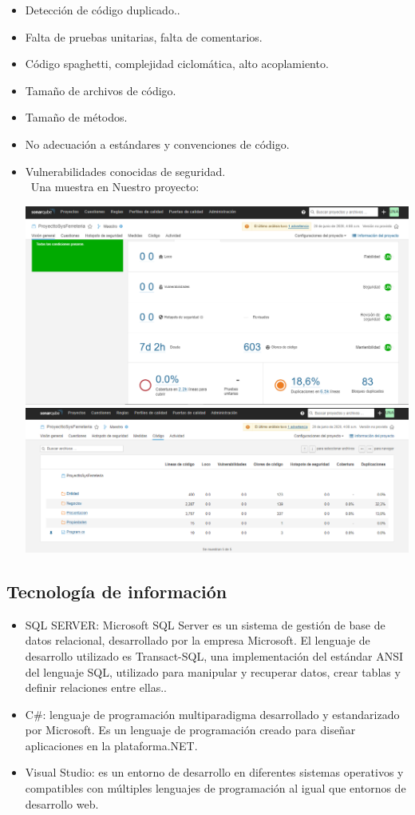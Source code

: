 \documentclass[preprint,12pt]{elsarticle}
\begin{document}
\begin{itemize}
	\item Detección de código duplicado..
	\item Falta de pruebas unitarias, falta de comentarios. 
	\item Código spaghetti, complejidad ciclomática, alto acoplamiento.
	\item Tamaño de archivos de código.
	\item Tamaño de métodos.
	\item No adecuación a estándares y convenciones de código.
	\item Vulnerabilidades conocidas de seguridad.
	\\\
	Una muestra en Nuestro proyecto:
		\begin{center}
	\includegraphics[width=14cm]{./imagen/6} 
		\includegraphics[width=14cm]{./imagen/7} 
	\end{center}
	\end{itemize}

		\subsection{\textbf{Tecnología de información  }}
		\begin{itemize}
	\item 	SQL SERVER: Microsoft SQL Server es un sistema de gestión de base de datos relacional, desarrollado por la empresa Microsoft. El lenguaje de desarrollo utilizado es Transact-SQL, una implementación del estándar ANSI del lenguaje SQL, utilizado para manipular y recuperar datos, crear tablas y definir relaciones entre ellas..
	\item 	C#: lenguaje de programación multiparadigma desarrollado y estandarizado por Microsoft. Es un lenguaje de programación creado para diseñar aplicaciones en la plataforma.NET.
	\item 	Visual Studio: es un entorno de desarrollo en diferentes sistemas operativos y compatibles con múltiples lenguajes de programación al igual que entornos de desarrollo web. 
	\end{itemize}
\end{document}
